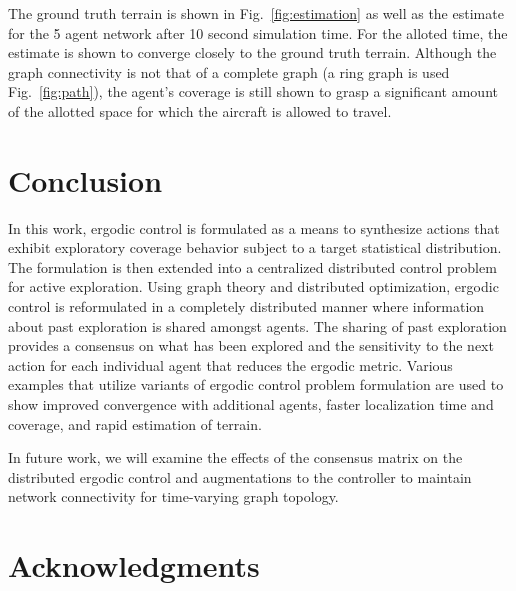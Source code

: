 \documentclass[conference]{IEEEtran}
\begin{document}
The ground truth terrain is shown in Fig.~\ref{fig:estimation} as well as the estimate for the 5 agent network after 10 second simulation time. For the alloted time, the estimate is shown to converge closely to the ground truth terrain. Although the graph connectivity is not that of a complete graph (a ring graph is used Fig.~\ref{fig:path}), the agent's coverage is still shown to grasp a significant amount of the allotted space for which the aircraft is allowed to travel.

\section{Conclusion} \label{sec:conc}

In this work, ergodic control is formulated as a means to synthesize actions that exhibit exploratory coverage behavior subject to a target statistical distribution. The formulation is then extended into a centralized distributed control problem for active exploration. Using graph theory and distributed optimization, ergodic control is reformulated in a completely distributed manner where information about past exploration is shared amongst agents. The sharing of past exploration provides a consensus on what has been explored and the sensitivity to the next action for each individual agent that reduces the ergodic metric. Various examples that utilize variants of ergodic control problem formulation are used to show improved convergence with additional agents, faster localization time and coverage, and rapid estimation of terrain.

In future work, we will examine the effects of the consensus matrix on the distributed ergodic control and augmentations to the controller to maintain network connectivity for time-varying graph topology.



\section*{Acknowledgments}




\balance
\end{document}
